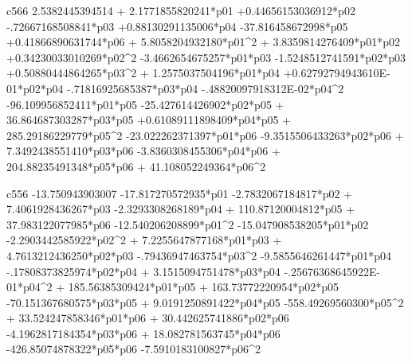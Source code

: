  c566
   2.5382445394514 + 2.1771855820241*p01 +0.44656153036912*p02  -.72667168508841*p03 +0.88130291135006*p04  -37.816458672998*p05 +0.41866890631744*p06 + 5.8058204932180*p01^2 + 3.8359814276409*p01*p02 +0.34230033010269*p02^2  -3.4662654675257*p01*p03  -1.5248512741591*p02*p03 +0.50880444864265*p03^2 + 1.2575037504196*p01*p04 +0.62792794943610E-01*p02*p04  -.71816925685387*p03*p04  -.48820097918312E-02*p04^2  -96.109956852411*p01*p05  -25.427614426902*p02*p05 + 36.864687303287*p03*p05 +0.61089111898409*p04*p05 + 285.29186229779*p05^2  -23.022262371397*p01*p06  -9.3515506433263*p02*p06 + 7.3492438551410*p03*p06  -3.8360308455306*p04*p06 + 204.88235491348*p05*p06 + 41.108052249364*p06^2 
  
 c556
  -13.750943903007  -17.817270572935*p01  -2.7832067184817*p02 + 7.4061928436267*p03  -2.3293308268189*p04 + 110.87120004812*p05 + 37.983122077985*p06  -12.540206208899*p01^2  -15.047908538205*p01*p02  -2.2903442585922*p02^2 + 7.2255647877168*p01*p03 + 4.7613212436250*p02*p03  -.79436947463754*p03^2  -9.5855646261447*p01*p04  -.17808373825974*p02*p04 + 3.1515094751478*p03*p04  -.25676368645922E-01*p04^2 + 185.56385309424*p01*p05 + 163.73772220954*p02*p05  -70.151367680575*p03*p05 + 9.0191250891422*p04*p05  -558.49269560300*p05^2 + 33.524247858346*p01*p06 + 30.442625741886*p02*p06  -4.1962817184354*p03*p06 + 18.082781563745*p04*p06  -426.85074878322*p05*p06  -7.5910183100827*p06^2 
  
